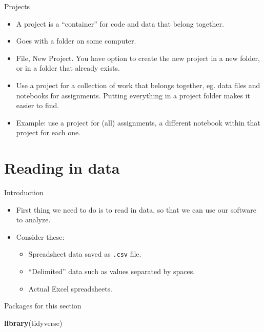 \documentclass[
  ignorenonframetext,
]{beamer}
\newenvironment{Shaded}{\begin{snugshade}}{\end{snugshade}}
\newcommand{\KeywordTok}[1]{\textcolor[rgb]{0.13,0.29,0.53}{\textbf{#1}}}
\newcommand{\NormalTok}[1]{#1}
\providecommand{\tightlist}{%
  \setlength{\itemsep}{0pt}\setlength{\parskip}{0pt}}
\begin{document}
\begin{frame}{Projects}
\protect\hypertarget{projects}{}

\begin{itemize}
\tightlist
\item
  A project is a ``container'' for code and data that belong together.
\item
  Goes with a folder on some computer.
\item
  File, New Project. You have option to create the new project in a new
  folder, or in a folder that already exists.
\item
  Use a project for a collection of work that belongs together, eg. data
  files and notebooks for assignments. Putting everything in a project
  folder makes it easier to find.
\item
  Example: use a project for (all) assignments, a different notebook
  within that project for each one.
\end{itemize}

\end{frame}

\hypertarget{reading-in-data}{%
\section{Reading in data}\label{reading-in-data}}

\begin{frame}[fragile]{Introduction}
\protect\hypertarget{introduction}{}

\begin{itemize}
\tightlist
\item
  First thing we need to do is to read in data, so that we can use our
  software to analyze.
\item
  Consider these:

  \begin{itemize}
  \tightlist
  \item
    Spreadsheet data saved as \texttt{.csv} file.
  \item
    ``Delimited'' data such as values separated by spaces.
  \item
    Actual Excel spreadsheets.
  \end{itemize}
\end{itemize}

\end{frame}

\begin{frame}[fragile]{Packages for this section}
\protect\hypertarget{packages-for-this-section}{}

\begin{Shaded}
\begin{Highlighting}[]
\KeywordTok{library}\NormalTok{(tidyverse)}
\end{Highlighting}
\end{Shaded}

\end{frame}
\end{document}
